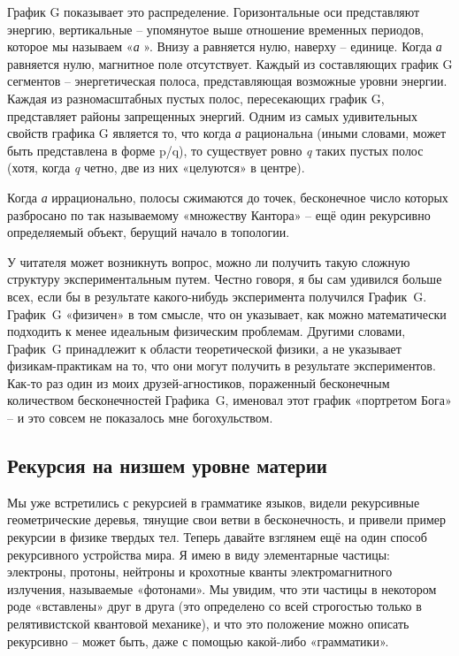 \documentclass[../main.tex]{subfiles}
\begin{document}
График G показывает это распределение. Горизонтальные оси представляют энергию, вертикальные \--- упомянутое выше отношение временных периодов, которое мы называем «\emph{а} ». Внизу а равняется нулю, наверху \--- единице. Когда \emph{а} равняется нулю, магнитное поле отсутствует. Каждый из составляющих график G сегментов \--- энергетическая полоса, представляющая возможные уровни энергии. Каждая из разномасштабных пустых полос, пересекающих график G, представляет районы запрещенных энергий. Одним из самых удивительных свойств графика G является то, что когда \emph{а} рациональна (иными словами, может быть представлена в форме p/q), то существует ровно \emph{q} таких пустых полос (хотя, когда \emph{q} четно, две из них «целуются» в центре).

Когда \emph{а} иррационально, полосы сжимаются до точек, бесконечное число которых разбросано по так называемому «множеству Кантора» \--- ещё один рекурсивно определяемый объект, берущий начало в топологии.

У читателя может возникнуть вопрос, можно ли получить такую сложную структуру экспериментальным путем. Честно говоря, я бы сам удивился больше всех, если бы в результате какого-нибудь эксперимента получился График~G\@. График~G «физичен» в том смысле, что он указывает, как можно математически подходить к менее идеальным физическим проблемам. Другими словами, График~G принадлежит к области теоретической физики, а не указывает физикам-практикам на то, что они могут получить в результате экспериментов. Как-то раз один из моих друзей-агностиков, пораженный бесконечным количеством бесконечностей Графика~G, именовал этот график «портретом Бога» \--- и это совсем не показалось мне богохульством.


\subsection{Рекурсия на низшем уровне материи}

Мы уже встретились с рекурсией в грамматике языков, видели рекурсивные геометрические деревья, тянущие свои ветви в бесконечность, и привели пример рекурсии в физике твердых тел. Теперь давайте взглянем ещё на один способ рекурсивного устройства мира. Я имею в виду элементарные частицы: электроны, протоны, нейтроны и крохотные кванты электромагнитного излучения, называемые «фотонами». Мы увидим, что эти частицы в некотором роде «вставлены» друг в друга (это определено со всей строгостью только в релятивистской квантовой механике), и что это положение можно описать рекурсивно \--- может быть, даже с помощью какой-либо «грамматики».
\end{document}
